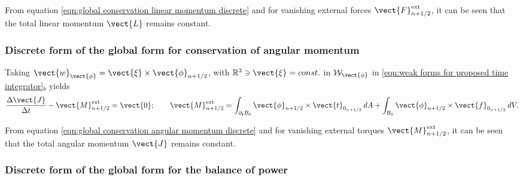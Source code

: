 {{From equation \eqref{eqn:global conservation linear momentum discrete} and for vanishing external forces $\vect{F}^{\text{ext}}_{n+1/2}$, it can be seen that the total linear momentum $\vect{L}$ remains constant.

\subsubsection{Discrete form of the global form for conservation of angular momentum}\label{eqn:discrete form angular momentum}

Taking $\vect{w}_{\vect{\phi}} = \vect{\xi}\times\vect{\phi}_{n+1/2}$, with $\mathbb{R}^3\ni\vect{\xi}=const.$ in $\mathcal{W}_{\vect{\phi}}$ in \eqref{eqn:weak forms for proposed time integrator}$_b$ yields
%
\begin{equation}\label{eqn:global conservation angular momentum discrete}
%
\frac{\Delta\vect{J}}{\Delta t} - \vect{M}_{n+1/2}^{\text{ext}} = \vect{0};\qquad
%
\vect{M}^{\text{ext}}_{n+1/2} =    
\int_{\partial_{\boldsymbol{t}}\mathcal{B}_0}\vect{\phi}_{n+1/2}\times\vect{t}_{0_{n+1/2}}\,dA
+\int_{\mathcal{B}_0}\vect{\phi}_{n+1/2}\times\vect{f}_{0_{n+1/2}}\,dV.
\end{equation}
%
%

From equation \eqref{eqn:global conservation angular momentum discrete} and for vanishing external torques $\vect{M}^{\text{ext}}_{n+1/2}$, it can be seen that the total angular momentum $\vect{J}$ remains constant.

\subsubsection{Discrete form of the global form for the balance of power}\label{eqn:conservation of energy discrete}


}}

